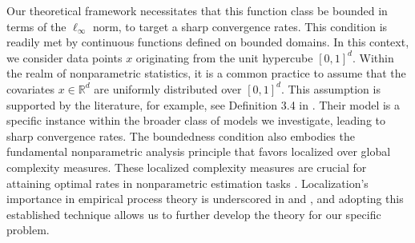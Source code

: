 \documentclass[twoside,11pt]{article}
\begin{document}
Our theoretical framework necessitates that this function class be bounded in terms of the $\ell_{\infty}$ norm, to target a sharp convergence rates. This condition is readily met by continuous functions defined on bounded domains. In this context, we consider data points $x$ originating from the unit hypercube $[0,1]^d$. Within the realm of nonparametric statistics, it is a common practice to assume that the covariates $x \in \mathbb{R}^d$ are uniformly distributed over $[0,1]^d$. This assumption is supported by the literature, for example, see Definition 3.4 in \cite{gyorfi2002distribution}. Their model is a specific instance within the broader class of models we investigate, leading to sharp convergence rates. 
The boundedness condition also embodies the fundamental nonparametric analysis principle that favors localized over global complexity measures. These localized complexity measures are crucial for attaining optimal rates in nonparametric estimation tasks \cite{koltchinskii2001rademacher, koltchinskii2006local, bartlett2005local, mendelson2002geometric, bartlett2002rademacher}. Localization's importance in empirical process theory is underscored in \cite{alexander1987rates} and \cite{geer2000empirical}, and adopting this established technique allows us to further develop the theory for our specific problem.
\end{document}
